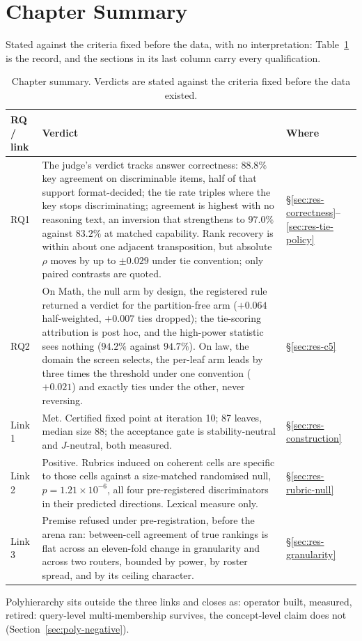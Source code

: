 \section{Chapter Summary}\label{sec:res-summary}

Stated against the criteria fixed before the data, with no
interpretation: Table~\ref{tab:res-summary} is the record, and the
sections in its last column carry every qualification.

\begin{table}[htbp]
\centering
\caption{Chapter summary. Verdicts are stated against the criteria
fixed before the data existed.}
\label{tab:res-summary}
\begin{tabular}{p{1.4cm}p{7.8cm}p{3.2cm}}
\toprule
RQ / link & Verdict & Where \\
\midrule
RQ1 & The judge's verdict tracks answer correctness: $88.8\%$ key
agreement on discriminable items, half of that support format-decided;
the tie rate triples where the key stops discriminating; agreement is
highest with no reasoning text, an inversion that strengthens to
$97.0\%$ against $83.2\%$ at matched capability. Rank recovery is
within about one adjacent transposition, but absolute $\rho$ moves by
up to $\pm0.029$ under tie convention; only paired contrasts are
quoted. &
\S\ref{sec:res-correctness}--\ref{sec:res-tie-policy} \\
\addlinespace
RQ2 & On Math, the null arm by design, the registered rule returned a
verdict for the partition-free arm ($+0.064$ half-weighted, $+0.007$
ties dropped); the tie-scoring attribution is post hoc, and the
high-power statistic sees nothing ($94.2\%$ against $94.7\%$). On law,
the domain the screen selects, the per-leaf arm leads by three times
the threshold under one convention ($+0.021$) and exactly ties under
the other, never reversing. &
\S\ref{sec:res-c5} \\
\addlinespace
Link 1 & Met. Certified fixed point at iteration 10; 87 leaves, median
size 88; the acceptance gate is stability-neutral and $J$-neutral,
both measured. &
\S\ref{sec:res-construction} \\
\addlinespace
Link 2 & Positive. Rubrics induced on coherent cells are specific to
those cells against a size-matched randomised null,
$p = 1.21 \times 10^{-6}$, all four pre-registered discriminators in
their predicted directions. Lexical measure only. &
\S\ref{sec:res-rubric-null} \\
\addlinespace
Link 3 & Premise refused under pre-registration, before the arena ran:
between-cell agreement of true rankings is flat across an eleven-fold
change in granularity and across two routers, bounded by power, by
roster spread, and by its ceiling character. &
\S\ref{sec:res-granularity} \\
\bottomrule
\end{tabular}
\end{table}

Polyhierarchy sits outside the three links and closes as: operator
built, measured, retired: query-level multi-membership survives,
the concept-level claim does not (Section~\ref{sec:poly-negative}).
